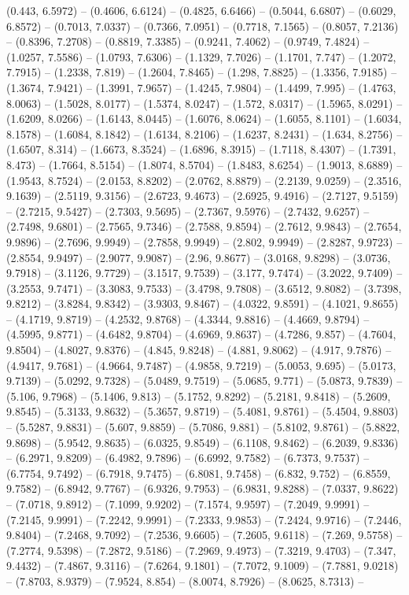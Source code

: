 (0.443, 6.5972) -- (0.4606, 6.6124) -- (0.4825, 6.6466) -- (0.5044, 6.6807) -- (0.6029, 6.8572) -- (0.7013, 7.0337) -- (0.7366, 7.0951) -- (0.7718, 7.1565) -- (0.8057, 7.2136) -- (0.8396, 7.2708) -- (0.8819, 7.3385) -- (0.9241, 7.4062) -- (0.9749, 7.4824) -- (1.0257, 7.5586) -- (1.0793, 7.6306) -- (1.1329, 7.7026) -- (1.1701, 7.747) -- (1.2072, 7.7915) -- (1.2338, 7.819) -- (1.2604, 7.8465) -- (1.298, 7.8825) -- (1.3356, 7.9185) -- (1.3674, 7.9421) -- (1.3991, 7.9657) -- (1.4245, 7.9804) -- (1.4499, 7.995) -- (1.4763, 8.0063) -- (1.5028, 8.0177) -- (1.5374, 8.0247) -- (1.572, 8.0317) -- (1.5965, 8.0291) -- (1.6209, 8.0266) -- (1.6143, 8.0445) -- (1.6076, 8.0624) -- (1.6055, 8.1101) -- (1.6034, 8.1578) -- (1.6084, 8.1842) -- (1.6134, 8.2106) -- (1.6237, 8.2431) -- (1.634, 8.2756) -- (1.6507, 8.314) -- (1.6673, 8.3524) -- (1.6896, 8.3915) -- (1.7118, 8.4307) -- (1.7391, 8.473) -- (1.7664, 8.5154) -- (1.8074, 8.5704) -- (1.8483, 8.6254) -- (1.9013, 8.6889) -- (1.9543, 8.7524) -- (2.0153, 8.8202) -- (2.0762, 8.8879) -- (2.2139, 9.0259) -- (2.3516, 9.1639) -- (2.5119, 9.3156) -- (2.6723, 9.4673) -- (2.6925, 9.4916) -- (2.7127, 9.5159) -- (2.7215, 9.5427) -- (2.7303, 9.5695) -- (2.7367, 9.5976) -- (2.7432, 9.6257) -- (2.7498, 9.6801) -- (2.7565, 9.7346) -- (2.7588, 9.8594) -- (2.7612, 9.9843) -- (2.7654, 9.9896) -- (2.7696, 9.9949) -- (2.7858, 9.9949) -- (2.802, 9.9949) -- (2.8287, 9.9723) -- (2.8554, 9.9497) -- (2.9077, 9.9087) -- (2.96, 9.8677) -- (3.0168, 9.8298) -- (3.0736, 9.7918) -- (3.1126, 9.7729) -- (3.1517, 9.7539) -- (3.177, 9.7474) -- (3.2022, 9.7409) -- (3.2553, 9.7471) -- (3.3083, 9.7533) -- (3.4798, 9.7808) -- (3.6512, 9.8082) -- (3.7398, 9.8212) -- (3.8284, 9.8342) -- (3.9303, 9.8467) -- (4.0322, 9.8591) -- (4.1021, 9.8655) -- (4.1719, 9.8719) -- (4.2532, 9.8768) -- (4.3344, 9.8816) -- (4.4669, 9.8794) -- (4.5995, 9.8771) -- (4.6482, 9.8704) -- (4.6969, 9.8637) -- (4.7286, 9.857) -- (4.7604, 9.8504) -- (4.8027, 9.8376) -- (4.845, 9.8248) -- (4.881, 9.8062) -- (4.917, 9.7876) -- (4.9417, 9.7681) -- (4.9664, 9.7487) -- (4.9858, 9.7219) -- (5.0053, 9.695) -- (5.0173, 9.7139) -- (5.0292, 9.7328) -- (5.0489, 9.7519) -- (5.0685, 9.771) -- (5.0873, 9.7839) -- (5.106, 9.7968) -- (5.1406, 9.813) -- (5.1752, 9.8292) -- (5.2181, 9.8418) -- (5.2609, 9.8545) -- (5.3133, 9.8632) -- (5.3657, 9.8719) -- (5.4081, 9.8761) -- (5.4504, 9.8803) -- (5.5287, 9.8831) -- (5.607, 9.8859) -- (5.7086, 9.881) -- (5.8102, 9.8761) -- (5.8822, 9.8698) -- (5.9542, 9.8635) -- (6.0325, 9.8549) -- (6.1108, 9.8462) -- (6.2039, 9.8336) -- (6.2971, 9.8209) -- (6.4982, 9.7896) -- (6.6992, 9.7582) -- (6.7373, 9.7537) -- (6.7754, 9.7492) -- (6.7918, 9.7475) -- (6.8081, 9.7458) -- (6.832, 9.752) -- (6.8559, 9.7582) -- (6.8942, 9.7767) -- (6.9326, 9.7953) -- (6.9831, 9.8288) -- (7.0337, 9.8622) -- (7.0718, 9.8912) -- (7.1099, 9.9202) -- (7.1574, 9.9597) -- (7.2049, 9.9991) -- (7.2145, 9.9991) -- (7.2242, 9.9991) -- (7.2333, 9.9853) -- (7.2424, 9.9716) -- (7.2446, 9.8404) -- (7.2468, 9.7092) -- (7.2536, 9.6605) -- (7.2605, 9.6118) -- (7.269, 9.5758) -- (7.2774, 9.5398) -- (7.2872, 9.5186) -- (7.2969, 9.4973) -- (7.3219, 9.4703) -- (7.347, 9.4432) -- (7.4867, 9.3116) -- (7.6264, 9.1801) -- (7.7072, 9.1009) -- (7.7881, 9.0218) -- (7.8703, 8.9379) -- (7.9524, 8.854) -- (8.0074, 8.7926) -- (8.0625, 8.7313) -- 